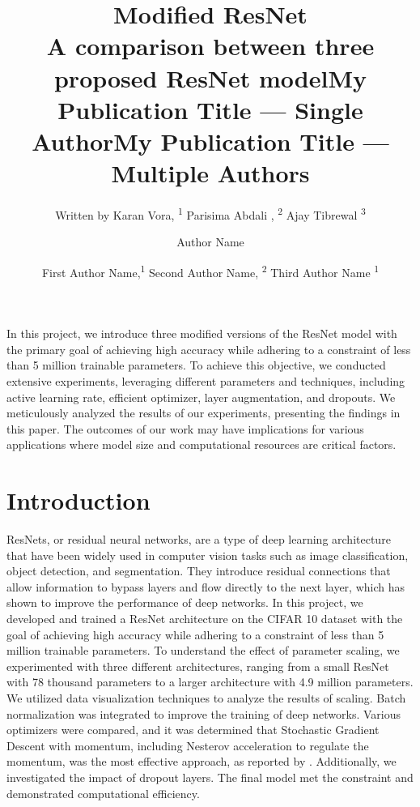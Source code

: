 \documentclass[letterpaper]{article} %
\title{Modified ResNet \\ A comparison between three proposed ResNet model}
\author{
    Written by Karan Vora, \textsuperscript{\rm 1}
    Parisima Abdali , \textsuperscript{\rm 2}
    Ajay Tibrewal \textsuperscript{\rm 3}
}
\title{My Publication Title --- Single Author}
\author {
    Author Name
}
\title{My Publication Title --- Multiple Authors}
\author {
    First Author Name,\textsuperscript{\rm 1}
    Second Author Name, \textsuperscript{\rm 2}
    Third Author Name \textsuperscript{\rm 1}
}
\begin{document}
\maketitle

\begin{abstract}

\end{abstract}
In this project, we introduce three modified versions of the ResNet model with the primary goal of achieving high accuracy while adhering to a constraint of less than 5 million trainable parameters. To achieve this objective, we conducted extensive experiments, leveraging different parameters and techniques, including active learning rate, efficient optimizer, layer augmentation, and dropouts. We meticulously analyzed the results of our experiments, presenting the findings in this paper. The outcomes of our work may have implications for various applications where model size and computational resources are critical factors.


\section{Introduction}
ResNets, or residual neural networks, are a type of deep learning architecture that have been widely used in computer vision tasks such as image classification, object detection, and segmentation.
 They introduce residual connections that allow information to bypass layers and flow directly to the next layer, which has shown to improve the performance of deep networks.
  In this project, we developed and trained a ResNet architecture on the CIFAR 10 dataset \cite{c:25} with the goal of achieving high accuracy while adhering to a constraint of less than 5 million trainable parameters. To understand the effect of parameter scaling, we experimented with three different architectures, ranging from a small ResNet with 78 thousand parameters to a larger architecture with 4.9 million parameters.
 We utilized data visualization techniques to analyze the results of scaling.  Batch normalization was integrated to improve the training of deep networks. Various optimizers were compared, and it was determined that Stochastic Gradient Descent with momentum, including Nesterov acceleration to regulate the momentum, was the most effective approach, as reported by \cite{c:26}. Additionally, we investigated the impact of dropout layers. The final model met the constraint and demonstrated computational efficiency.
 
\end{document}
